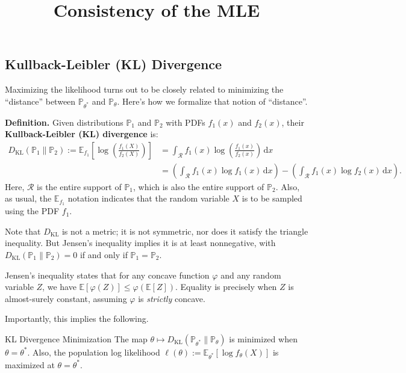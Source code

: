 \title{Consistency of the MLE}



\subsection{Kullback-Leibler (KL) Divergence}

Maximizing the likelihood turns out to be closely related to
minimizing the ``distance'' between
$\mathbb{P}_{\theta^*}$ and $\mathbb{P}_{\theta}$.
Here's how we formalize that notion of ``distance''.

\textbf{Definition.} Given distributions $\mathbb{P}_1$ and $\mathbb{P}_2$
with PDFs $f_1(x)$ and $f_2(x)$, their \textbf{Kullback-Leibler (KL) divergence} is:
\begin{align*} D_{\mathrm{KL}}(\mathbb{P}_1 \parallel \mathbb{P}_2) :=
\mathbb{E}_{f_1}\left[ \log\left(\frac{f_1(X)}{f_2(X)}\right)\right] & =
\int_{\mathcal{R}} f_1(x) \log \left(\frac{f_1(x)}{f_2(x)}\right) \, \mathrm{d}x \\ & =
\left( \int_{\mathcal{R}} f_1(x) \log f_1(x) \, \mathrm{d}x \right) - 
\left( \int_{\mathcal{R}} f_1(x) \log f_2(x) \, \mathrm{d}x \right). \end{align*}
Here, $\mathcal{R}$ is the entire support of $\mathbb{P}_1$,
which is also the entire support of $\mathbb{P}_2$.
Also, as usual, the $\mathbb{E}_{f_1}$ notation
indicates that the random variable $X$ is to be sampled using the PDF $f_1$.

Note that $D_{\mathrm{KL}}$ is not a metric; it is not symmetric, nor does it
satisfy the triangle inequality.  But Jensen's inequality implies it is at least nonnegative,
with $D_{\mathrm{KL}}(\mathbb{P}_1 \parallel \mathbb{P}_2) = 0$ if and only if
$\mathbb{P}_1 = \mathbb{P}_2$.

\begin{remark}
    Jensen's inequality states that
    for any concave function $\varphi$ and any random variable $Z$,
    we have $\mathbb{E}[\varphi(Z)] \leq \varphi(\mathbb{E}[Z])$.
    Equality is precisely when $Z$ is almost-surely constant,
    assuming $\varphi$ is \emph{strictly} concave.
\end{remark}

Importantly, this implies the following.

\begin{theorem}{KL Divergence Minimization}
    The map $\theta \mapsto
    D_{\mathrm{KL}}(\mathbb{P}_{\theta^*} \parallel \mathbb{P}_{\theta})$
    is minimized when $\theta = \theta^*$.
    Also, the population log likelihood
    $\ell(\theta) := \mathbb{E}_{\theta^*}[\log f_{\theta}(X)]$
    is maximized at $\theta = \theta^*$.
\end{theorem}

